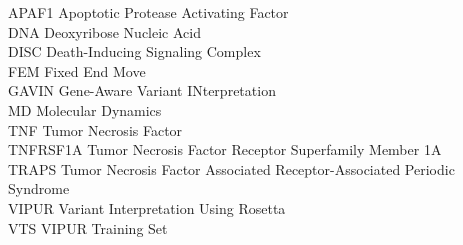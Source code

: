 APAF1 Apoptotic Protease Activating Factor\\
DNA Deoxyribose Nucleic Acid\\
DISC Death-Inducing Signaling Complex\\
FEM Fixed End Move\\
GAVIN Gene-Aware Variant INterpretation\\
MD	Molecular Dynamics\\
TNF Tumor Necrosis Factor\\
TNFRSF1A Tumor Necrosis Factor Receptor Superfamily Member 1A\\
TRAPS Tumor Necrosis Factor Associated Receptor-Associated Periodic Syndrome\\
VIPUR Variant Interpretation Using Rosetta\\
VTS VIPUR Training Set\\